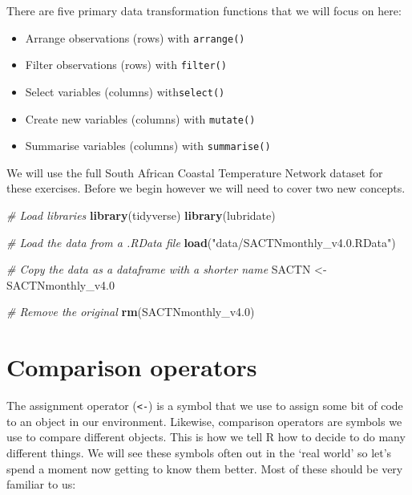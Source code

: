 \documentclass[
]{book}
\newenvironment{Shaded}{\begin{snugshade}}{\end{snugshade}}
\newcommand{\CommentTok}[1]{\textcolor[rgb]{0.56,0.35,0.01}{\textit{#1}}}
\newcommand{\FloatTok}[1]{\textcolor[rgb]{0.00,0.00,0.81}{#1}}
\newcommand{\KeywordTok}[1]{\textcolor[rgb]{0.13,0.29,0.53}{\textbf{#1}}}
\newcommand{\NormalTok}[1]{#1}
\newcommand{\StringTok}[1]{\textcolor[rgb]{0.31,0.60,0.02}{#1}}
\providecommand{\tightlist}{%
  \setlength{\itemsep}{0pt}\setlength{\parskip}{0pt}}
\begin{document}
There are five primary data transformation functions that we will focus on here:

\begin{itemize}
\tightlist
\item
  Arrange observations (rows) with \texttt{arrange()}\\
\item
  Filter observations (rows) with \texttt{filter()}\\
\item
  Select variables (columns) with\texttt{select()}\\
\item
  Create new variables (columns) with \texttt{mutate()}\\
\item
  Summarise variables (columns) with \texttt{summarise()}
\end{itemize}

We will use the full South African Coastal Temperature Network dataset for these exercises. Before we begin however we will need to cover two new concepts.

\begin{Shaded}
\begin{Highlighting}[]
\CommentTok{\# Load libraries}
\KeywordTok{library}\NormalTok{(tidyverse)}
\KeywordTok{library}\NormalTok{(lubridate)}

\CommentTok{\# Load the data from a .RData file}
\KeywordTok{load}\NormalTok{(}\StringTok{"data/SACTNmonthly\_v4.0.RData"}\NormalTok{)}

\CommentTok{\# Copy the data as a dataframe with a shorter name}
\NormalTok{SACTN <{-}}\StringTok{ }\NormalTok{SACTNmonthly\_v4}\FloatTok{.0}

\CommentTok{\# Remove the original}
\KeywordTok{rm}\NormalTok{(SACTNmonthly\_v4}\FloatTok{.0}\NormalTok{)}
\end{Highlighting}
\end{Shaded}

\hypertarget{comparison-operators}{%
\section{Comparison operators}\label{comparison-operators}}

The assignment operator (\texttt{\textless{}-}) is a symbol that we use to assign some bit of code to an object in our environment. Likewise, comparison operators are symbols we use to compare different objects. This is how we tell R how to decide to do many different things. We will see these symbols often out in the `real world' so let's spend a moment now getting to know them better. Most of these should be very familiar to us:
\end{document}
